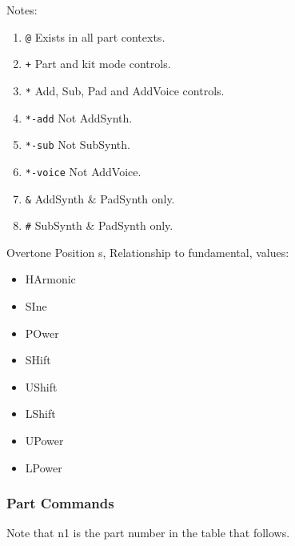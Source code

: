 Notes:

   \begin{enumerate}
      \item \texttt{@} Exists in all part contexts.
      \item \texttt{+} Part and kit mode controls.
      \item \texttt{*} Add, Sub, Pad and AddVoice controls.
      \item \texttt{*-add} Not AddSynth.
      \item \texttt{*-sub} Not SubSynth.
      \item \texttt{*-voice} Not AddVoice.
      \item \texttt{\&} AddSynth \& PadSynth only.
      \item \texttt{\#} SubSynth \& PadSynth only.
   \end{enumerate}

Overtone Position s, Relationship to fundamental, values:

   \begin{itemize}
      \item HArmonic
      \item SIne
      \item POwer
      \item SHift
      \item UShift
      \item LShift
      \item UPower
      \item LPower
   \end{itemize}

\subsubsection{Part Commands}
\label{subsec:command_line_part_commands}

   Note that n1 is the part number in the table that follows.

